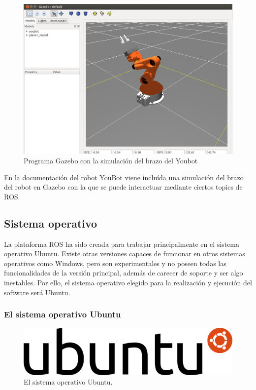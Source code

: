 \documentclass[12pt, a4paper]{report}
\begin{document}
\begin{itemize}
\begin{itemize}
\begin{figure}[h]
	\centering
		\includegraphics[scale=0.3]{../img/gazebo_img.png} 
	\caption[Programa Gazebo con la simulación del brazo del Youbot]{Programa Gazebo con la simulación del brazo del Youbot} 
	\label{fig: gazebo_img}
\end{figure}

En la documentación del robot YouBot viene incluída una simulación del brazo del robot en Gazebo con la que se puede interactuar mediante ciertos topics de ROS.

\end{itemize}

\end{itemize}

\subsection{Sistema operativo}

La plataforma ROS ha sido creada para trabajar principalmente en el sistema operativo Ubuntu. Existe otras versiones capaces de funcionar en otros sistemas operativos como Windows, pero son experimentales y no poseen todas las funcionalidades de la versión principal, además de carecer de soporte y ser algo inestables. Por ello, el sistema operativo elegido para la realización y ejecución del software será Ubuntu.

\subsubsection{El sistema operativo Ubuntu}

\begin{figure}
  \begin{center}
    \includegraphics[scale=0.3]{../img/ubuntu_logo.png} 
  \end{center}
  \caption[El sistema operativo Ubuntu]{El sistema operativo Ubuntu.}
  \label{fig: ubuntu_logo}
\end{figure}
\end{document}
